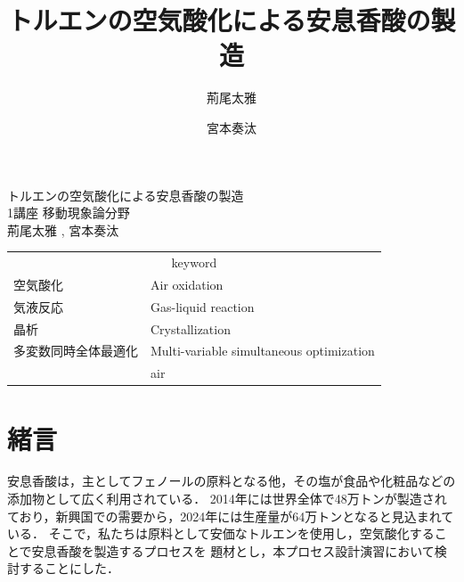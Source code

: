 \usepackage[version=4]{mhchem}
\usepackage{url}


\graphicspath{{./figure/}}



\newcommand{\diff}{\mathrm{d}}







\title{トルエンの空気酸化による安息香酸の製造}
\author{荊尾太雅 \and 宮本奏汰}

\newcommand{\diff}{\mathrm{d}}



\begin{titlepage}
\vspace{5cm}
\centering
{\Huge トルエンの空気酸化による安息香酸の製造}\\
\vspace{2cm}
\centering
{\Large 1講座 移動現象論分野}\\
\vspace{0.5cm}
\centering
{\large 荊尾太雅 , 宮本奏汰}\\
\vspace{3cm}
\begin{table}[htbp]
    \begin{center}
        \begin{tabular}[htbp]{ll}
            \multicolumn{2}{c}{{\LARGE keyword}}\\
            {\Large 空気酸化}&{\Large Air oxidation}\\
            {\Large 気液反応}&{\Large Gas-liquid reaction}\\
            {\Large 晶析}&{\Large Crystallization}\\
            {\Large 多変数同時全体最適化}&{\Large Multi-variable simultaneous optimization}\\
            {\Large }&{\Large air}\\
        \end{tabular}
    \end{center}
\end{table}
\end{titlepage}

\setcounter{tocdepth}{2}
\tableofcontents


\chapter{緒言}
安息香酸は，主としてフェノールの原料となる他，その塩が食品や化粧品などの添加物として広く利用されている．
2014年には世界全体で48万トンが製造されており，新興国での需要から，2024年には生産量が64万トンとなると見込まれている．
そこで，私たちは原料として安価なトルエンを使用し，空気酸化することで安息香酸を製造するプロセスを
題材とし，本プロセス設計演習において検討することにした．

